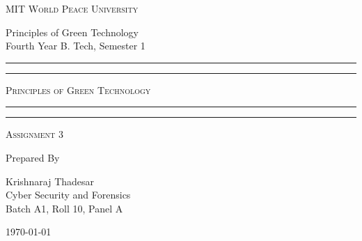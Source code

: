 \documentclass[11pt]{article}
\begin{document}
\begin{titlepage}
    \centering


    \huge\textsc{
        MIT World Peace University
    }\\

    \vspace{0.75\baselineskip} %

    \LARGE{
        Principles of Green Technology\\
        Fourth Year B. Tech, Semester 1
    }

    \vfill %


    \rule{\textwidth}{1.6pt}\vspace*{-\baselineskip}\vspace*{2pt}
    \rule{\textwidth}{0.6pt}
    \vspace{0.75\baselineskip} %



    \huge{\textsc{
            Principles of Green Technology
        }} \\



    \vspace{0.5\baselineskip} %
    \rule{\textwidth}{0.6pt}\vspace*{-\baselineskip}\vspace*{2.8pt}
    \rule{\textwidth}{1.6pt}

    \vspace{1\baselineskip} %


    \LARGE\textsc{
        Assignment 3
    } %
    \vfill


    Prepared By
    \vspace{0.5\baselineskip} %

    \Large{
        Krishnaraj Thadesar \\
        Cyber Security and Forensics\\
        Batch A1, Roll 10, Panel A
    }


    \vspace{0.5\baselineskip} %
    \today

\end{titlepage}
\end{document}
